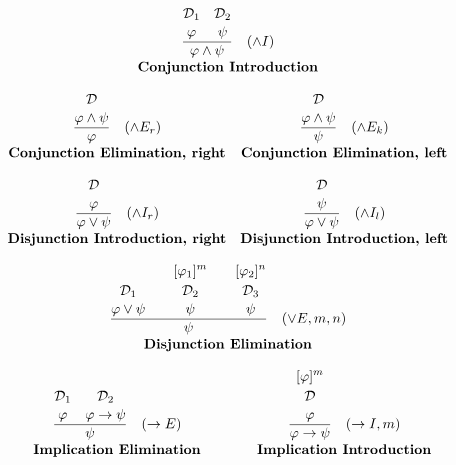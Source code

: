 \[
\begin{array}{c c}

\multicolumn{2}{c}{
\frac{\overset{\displaystyle\mathcal{D}_1\strut}{\displaystyle \varphi \strut}\quad \overset{\displaystyle\mathcal{D}_2\strut} {\displaystyle \psi \strut}}{\displaystyle \varphi \land \psi \strut} \quad (\land I)
} \\[5pt]
\multicolumn{2}{c}{\textbf{Conjunction Introduction}} \\[10pt]

\frac{\displaystyle \overset{\displaystyle\mathcal{D} \strut} {\varphi \land \psi \strut}}{\displaystyle \varphi \strut} \quad (\land E_r) 
& \frac{\displaystyle \overset{\displaystyle\mathcal{D} \strut} {\varphi \land \psi \strut}}{\displaystyle \psi \strut} \quad (\land E_k) \\[5pt]
\textbf{Conjunction Elimination, right} & \textbf{Conjunction Elimination, left} \\[10pt]

\frac{\displaystyle \overset{\displaystyle\mathcal{D} \strut} {\varphi 
\strut}}{\displaystyle \varphi \vee \psi \strut} \quad (\land I_r) 
& \frac{\displaystyle \overset{\displaystyle\mathcal{D} \strut} {\psi \strut}}{\displaystyle \varphi \vee \psi \strut} \quad (\land I_l) \\[5pt]
\textbf{Disjunction Introduction, right} & \textbf{Disjunction Introduction, left} \\[10pt]

\multicolumn{2}{c}{
\frac{\overset{\displaystyle\mathcal{D}_1 \strut} {\displaystyle\varphi \vee \psi \strut} \quad \quad \overset{\displaystyle[\varphi_1]^m\strut}{\overset{\displaystyle\mathcal{D}_2 \strut} {\displaystyle\psi 
\strut}} \quad \quad \overset{\displaystyle[\varphi_2]^n\strut}{\overset{\displaystyle\mathcal{D}_3 \strut} {\displaystyle\psi 
\strut}}}{\displaystyle\psi\strut} \quad (\vee E, m, n)
} \\[5pt]
\multicolumn{2}{c}{\textbf{Disjunction Elimination}} \\[10pt]

\frac{\overset{\displaystyle\mathcal{D}_1\strut}{\displaystyle \varphi \strut}\quad \overset{\displaystyle\mathcal{D}_2\strut} {\displaystyle \varphi \to \psi \strut}}{\displaystyle\psi\strut} \quad (\to E) 
& \frac{\overset{\displaystyle[\varphi]^m\strut}{\overset{\displaystyle\mathcal{D} \strut} {\displaystyle\varphi 
\strut}}}{\displaystyle \varphi \to \psi \strut} \quad (\to I, m) \\[5pt]
\textbf{Implication Elimination} & \textbf{Implication Introduction}\\[10pt]


\end{array}\]
